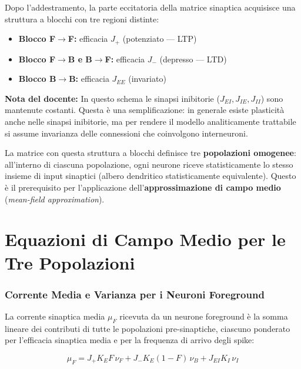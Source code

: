Dopo l'addestramento, la parte eccitatoria della matrice sinaptica acquisisce una struttura a blocchi con tre regioni distinte:

\begin{itemize}
    \item \textbf{Blocco F$\rightarrow$F:} efficacia $J_+$ (potenziato — LTP)
    \item \textbf{Blocco F$\rightarrow$B e B$\rightarrow$F:} efficacia $J_-$ (depresso — LTD)
    \item \textbf{Blocco B$\rightarrow$B:} efficacia $J_{EE}$ (invariato)
\end{itemize}

\begin{tcolorbox}[colback=gray!5, colframe=gray!40, arc=2mm, boxrule=0.5pt]
\textbf{Nota del docente:} In questo schema le sinapsi inibitorie ($J_{EI}, J_{IE}, J_{II}$) sono mantenute costanti. Questa è una semplificazione: in generale esiste plasticità anche nelle sinapsi inibitorie, ma per rendere il modello analiticamente trattabile si assume invarianza delle connessioni che coinvolgono interneuroni.
\end{tcolorbox}

La matrice con questa struttura a blocchi definisce tre \textbf{popolazioni omogenee}: all'interno di ciascuna popolazione, ogni neurone riceve statisticamente lo stesso insieme di input sinaptici (albero dendritico statisticamente equivalente). Questo è il prerequisito per l'applicazione dell'\textbf{approssimazione di campo medio} (\textit{mean-field approximation}).

\section{Equazioni di Campo Medio per le Tre Popolazioni}

\subsubsection{Corrente Media e Varianza per i Neuroni Foreground}

La corrente sinaptica media $\mu_F$ ricevuta da un neurone foreground è la somma lineare dei contributi di tutte le popolazioni pre-sinaptiche, ciascuno ponderato per l'efficacia sinaptica media e per la frequenza di arrivo degli spike:

\begin{equation}
\mu_F = J_+ K_E F \,\nu_F + J_- K_E (1-F)\,\nu_B + J_{EI} K_I \,\nu_I
\end{equation}


